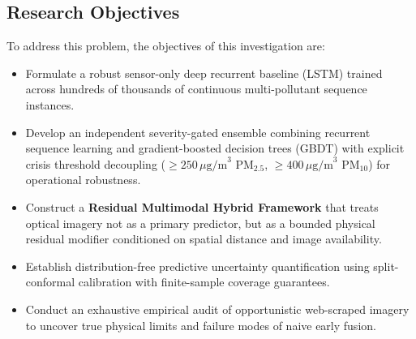 \documentclass[conference]{IEEEtran}
\begin{document}
\subsection{Research Objectives}
To address this problem, the objectives of this investigation are:
\begin{itemize}
    \item Formulate a robust sensor-only deep recurrent baseline (LSTM) trained across hundreds of thousands of continuous multi-pollutant sequence instances.
    \item Develop an independent severity-gated ensemble combining recurrent sequence learning and gradient-boosted decision trees (GBDT) with explicit crisis threshold decoupling ($\ge 250\,\mu\text{g/m}^3$ $\text{PM}_{2.5}$, $\ge 400\,\mu\text{g/m}^3$ $\text{PM}_{10}$) for operational robustness.
    \item Construct a \textbf{Residual Multimodal Hybrid Framework} that treats optical imagery not as a primary predictor, but as a bounded physical residual modifier conditioned on spatial distance and image availability.
    \item Establish distribution-free predictive uncertainty quantification using split-conformal calibration with finite-sample coverage guarantees.
    \item Conduct an exhaustive empirical audit of opportunistic web-scraped imagery to uncover true physical limits and failure modes of naive early fusion.
\end{itemize}
\end{document}
